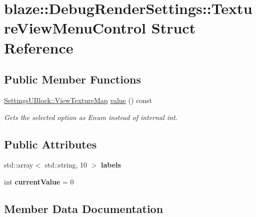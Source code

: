 \hypertarget{structblaze_1_1DebugRenderSettings_1_1TextureViewMenuControl}{}\section{blaze\+:\+:Debug\+Render\+Settings\+:\+:Texture\+View\+Menu\+Control Struct Reference}
\label{structblaze_1_1DebugRenderSettings_1_1TextureViewMenuControl}
\subsection*{Public Member Functions}
\begin{DoxyCompactItemize}
\item 
\mbox{\label{structblaze_1_1DebugRenderSettings_1_1TextureViewMenuControl_a178f60c535a98e978f256224eff9dc23}} 
\hyperlink{structblaze_1_1SettingsUBlock_aa79fb061eee4130840f5ba7a8b36fdff}{Settings\+U\+Block\+::\+View\+Texture\+Map} \hyperlink{structblaze_1_1DebugRenderSettings_1_1TextureViewMenuControl_a178f60c535a98e978f256224eff9dc23}{value} () const
\begin{DoxyCompactList}\small\item\em Gets the selected option as Enum instead of internal int. \end{DoxyCompactList}\end{DoxyCompactItemize}
\subsection*{Public Attributes}
\begin{DoxyCompactItemize}
\item 
std\+::array$<$ std\+::string, 10 $>$ {\bfseries labels}
\item 
\mbox{\label{structblaze_1_1DebugRenderSettings_1_1TextureViewMenuControl_aceac8a1dcde0a394f005e7fa5e003df8}} 
int {\bfseries current\+Value} = 0
\end{DoxyCompactItemize}


\subsection{Member Data Documentation}
\mbox{\label{structblaze_1_1DebugRenderSettings_1_1TextureViewMenuControl_a4f91ef91220b25eeddba219126267ebd}} 
